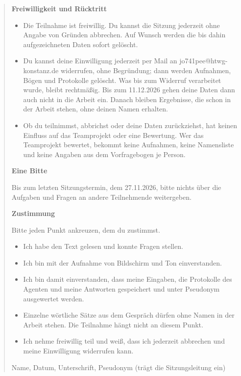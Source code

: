 \begin{quote}
\textbf{Freiwilligkeit und Rücktritt}

\begin{itemize}
\item Die Teilnahme ist freiwillig. Du kannst die Sitzung jederzeit ohne Angabe von Gründen abbrechen. Auf Wunsch werden die bis dahin aufgezeichneten Daten sofort gelöscht.
\item Du kannst deine Einwilligung jederzeit per Mail an jo741pee@htwg-konstanz.de widerrufen, ohne Begründung; dann werden Aufnahmen, Bögen und Protokolle gelöscht. Was bis zum Widerruf verarbeitet wurde, bleibt rechtmäßig. Bis zum 11.12.2026 gehen deine Daten dann auch nicht in die Arbeit ein. Danach bleiben Ergebnisse, die schon in der Arbeit stehen, ohne deinen Namen erhalten.
\item Ob du teilnimmst, abbrichst oder deine Daten zurückziehst, hat keinen Einfluss auf das Teamprojekt oder eine Bewertung. Wer das Teamprojekt bewertet, bekommt keine Aufnahmen, keine Namensliste und keine Angaben aus dem Vorfragebogen je Person.
\end{itemize}

\textbf{Eine Bitte}

Bis zum letzten Sitzungstermin, dem 27.11.2026, bitte nichts über die Aufgaben und Fragen an andere Teilnehmende weitergeben.

\textbf{Zustimmung}

Bitte jeden Punkt ankreuzen, dem du zustimmst.

\begin{itemize}
\item[\fbox{\phantom{x}}] Ich habe den Text gelesen und konnte Fragen stellen.
\item[\fbox{\phantom{x}}] Ich bin mit der Aufnahme von Bildschirm und Ton einverstanden.
\item[\fbox{\phantom{x}}] Ich bin damit einverstanden, dass meine Eingaben, die Protokolle des Agenten und meine Antworten gespeichert und unter Pseudonym ausgewertet werden.
\item[\fbox{\phantom{x}}] Einzelne wörtliche Sätze aus dem Gespräch dürfen ohne Namen in der Arbeit stehen. Die Teilnahme hängt nicht an diesem Punkt.
\item[\fbox{\phantom{x}}] Ich nehme freiwillig teil und weiß, dass ich jederzeit abbrechen und meine Einwilligung widerrufen kann.
\end{itemize}

Name, Datum, Unterschrift, Pseudonym (trägt die Sitzungsleitung ein)
\end{quote}


